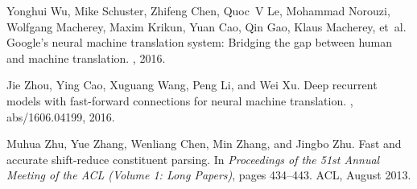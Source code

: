 \documentclass{article}
\begin{document}
\begin{thebibliography}{10}
  Yonghui Wu, Mike Schuster, Zhifeng Chen, Quoc~V Le, Mohammad Norouzi, Wolfgang
  Macherey, Maxim Krikun, Yuan Cao, Qin Gao, Klaus Macherey, et~al.
  \newblock Google's neural machine translation system: Bridging the gap between
  human and machine translation.
  , 2016.

  Jie Zhou, Ying Cao, Xuguang Wang, Peng Li, and Wei Xu.
  \newblock Deep recurrent models with fast-forward connections for neural
  machine translation.
  , abs/1606.04199, 2016.

  Muhua Zhu, Yue Zhang, Wenliang Chen, Min Zhang, and Jingbo Zhu.
  \newblock Fast and accurate shift-reduce constituent parsing.
  \newblock In {\em Proceedings of the 51st Annual Meeting of the ACL (Volume 1:
      Long Papers)}, pages 434--443. ACL, August 2013.

\end{thebibliography}

%

%
\end{document}

